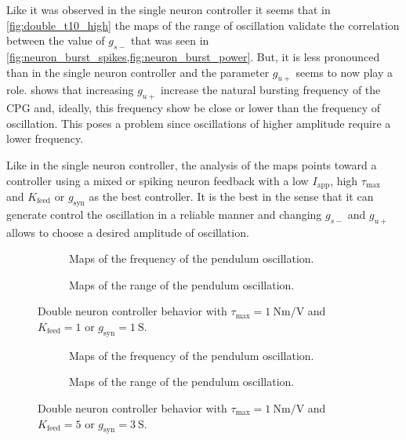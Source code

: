 Like it was observed in the single neuron controller it seems that in \cref{fig:double_t10_high} the maps of the range of oscillation validate the correlation between the value of $g_{s-}$ that was seen in \cref{fig:neuron_burst_spikes,fig:neuron_burst_power}. 
But, it is less pronounced than in the single neuron controller and the parameter $g_{u+}$ seems to now play a role.  
 shows that increasing $g_{u+}$ increase the natural bursting frequency of the CPG and, ideally, this frequency show be close or lower than the frequency of oscillation.
This poses a problem since oscillations of higher amplitude require a lower frequency.

Like in the single neuron controller, the analysis of the maps points toward a controller using a mixed or spiking neuron feedback with a low $I_\text{app}$, high $\tau_\text{max}$ and $K_\text{feed}$ or $g_\text{syn}$ as the best controller. 
It is the best in the sense that it can generate control the oscillation in a reliable manner and changing $g_{s-}$ and $g_{u+}$ allows to choose a desired amplitude of oscillation.

\begin{figure}[!htbp]
    \centering
    \begin{subfigure}[t][.46\textheight][b]{\textwidth}
        \centering
        \caption{Maps of the frequency of the pendulum oscillation.}
        \label{fig:double_t1_low_freq}
    \end{subfigure}
    
    \begin{subfigure}[b][.46\textheight][t]{\textwidth}
        \centering
        \caption{Maps of the range of the pendulum oscillation.}
        \label{fig:double_t1_low_range}
    \end{subfigure}
    \caption{Double neuron controller behavior with $\tau_\text{max} = \qty{1}{\newton\meter\per\volt}$ and $K_\text{feed} = 1$ or $g_{\text{syn}} = \qty{1}{\siemens}$.}
    \label{fig:double_t1_low}
\end{figure}

\begin{figure}[!htbp]
    \centering
    \begin{subfigure}[t][.46\textheight][b]{\textwidth}
        \centering
        \caption{Maps of the frequency of the pendulum oscillation.}
        \label{fig:double_t1_high_freq}  
    \end{subfigure}
    
    \begin{subfigure}[b][.46\textheight][t]{\textwidth}
        \centering
        \caption{Maps of the range of the pendulum oscillation.}
        \label{fig:double_t1_high_range}  
    \end{subfigure}
    \caption{Double neuron controller behavior with $\tau_\text{max} = \qty{1}{\newton\meter\per\volt}$ and $K_\text{feed} = 5$ or $g_{\text{syn}} = \qty{3}{\siemens}$.}
    \label{fig:double_t1_high}
\end{figure}

